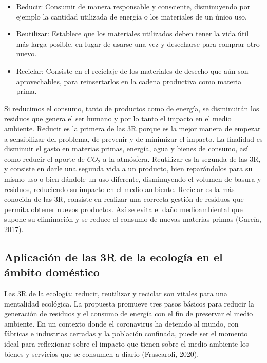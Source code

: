 \begin{itemize}
    \item Reducir: Consumir de manera responsable y consciente, disminuyendo por ejemplo la cantidad utilizada de energía o los materiales de un único uso.
    
    \item Reutilizar: Establece que los materiales utilizados deben tener la vida útil más larga posible, en lugar de usarse una vez y desecharse para comprar otro nuevo.
    
    \item Reciclar: Consiste en el reciclaje de los materiales de desecho que aún son aprovechables, para reinsertarlos en la cadena productiva como materia prima.
\end{itemize}

Si reducimos el consumo, tanto de productos como de energía, se disminuirán los residuos que genera el ser humano y por lo tanto el impacto en el medio ambiente. Reducir es la primera de las 3R porque es la mejor manera de empezar a sensibilizar del problema, de prevenir y de minimizar el impacto. La finalidad es disminuir el gasto en materias primas, energía, agua y bienes de consumo, así como reducir el aporte de $CO_2$ a la atmósfera. Reutilizar es la segunda de las 3R, y consiste en darle una segunda vida a un producto, bien reparándolos para su mismo uso o bien dándole un uso diferente, disminuyendo el volumen de basura y residuos, reduciendo su impacto en el medio ambiente. Reciclar es la más conocida de las 3R, consiste en realizar una correcta gestión de residuos que permita obtener nuevos productos. Así se evita el daño medioambiental que supone su eliminación y se reduce el consumo de nuevas materias primas (García, 2017).

{\setlength{\parskip}{0cm}
\subsection{Aplicación de las 3R de la ecología en el ámbito doméstico}

Las 3R de la ecología: reducir, reutilizar y reciclar son vitales para una mentalidad ecológica. La propuesta promueve tres pasos básicos para reducir la generación de residuos y el consumo de energía con el fin de preservar el medio ambiente. En un contexto donde el coronavirus ha detenido al mundo, con fábricas e industrias cerradas y la población confinada, puede ser el momento ideal para reflexionar sobre el impacto que tienen sobre el medio ambiente los bienes y servicios que se consumen a diario (Frascaroli, 2020).
}

